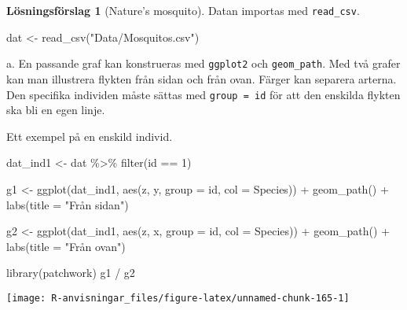\documentclass[
]{book}
\newenvironment{Shaded}{\begin{snugshade}}{\end{snugshade}}
\newcommand{\AttributeTok}[1]{\textcolor[rgb]{0.77,0.63,0.00}{#1}}
\newcommand{\DecValTok}[1]{\textcolor[rgb]{0.00,0.00,0.81}{#1}}
\newcommand{\FunctionTok}[1]{\textcolor[rgb]{0.00,0.00,0.00}{#1}}
\newcommand{\NormalTok}[1]{#1}
\newcommand{\OtherTok}[1]{\textcolor[rgb]{0.56,0.35,0.01}{#1}}
\newcommand{\SpecialCharTok}[1]{\textcolor[rgb]{0.00,0.00,0.00}{#1}}
\newcommand{\StringTok}[1]{\textcolor[rgb]{0.31,0.60,0.02}{#1}}
\theoremstyle{definition}
\theoremstyle{definition}
\theoremstyle{definition}
\theoremstyle{definition}
\newtheorem{hypothesis}{Lösningsförslag}[chapter]
\theoremstyle{remark}
\begin{document}
\begin{hypothesis}[Nature's mosquito]
Datan importas med \texttt{read\_csv}.

\begin{Shaded}
\begin{Highlighting}[]
\NormalTok{dat }\OtherTok{\textless{}{-}} \FunctionTok{read\_csv}\NormalTok{(}\StringTok{"Data/Mosquitos.csv"}\NormalTok{)}
\end{Highlighting}
\end{Shaded}

a. En passande graf kan konstrueras med \texttt{ggplot2} och \texttt{geom\_path}. Med två grafer kan man illustrera flykten från sidan och från ovan. Färger kan separera arterna. Den specifika individen måste sättas med \texttt{group\ =\ id} för att den enskilda flykten ska bli en egen linje.

Ett exempel på en enskild individ.

\begin{Shaded}
\begin{Highlighting}[]
\NormalTok{dat\_ind1 }\OtherTok{\textless{}{-}}\NormalTok{ dat }\SpecialCharTok{\%\textgreater{}\%} \FunctionTok{filter}\NormalTok{(id }\SpecialCharTok{==} \DecValTok{1}\NormalTok{)}

\NormalTok{g1 }\OtherTok{\textless{}{-}} \FunctionTok{ggplot}\NormalTok{(dat\_ind1, }\FunctionTok{aes}\NormalTok{(z, y, }\AttributeTok{group =}\NormalTok{ id, }\AttributeTok{col =}\NormalTok{ Species)) }\SpecialCharTok{+} 
  \FunctionTok{geom\_path}\NormalTok{() }\SpecialCharTok{+}
  \FunctionTok{labs}\NormalTok{(}\AttributeTok{title =} \StringTok{"Från sidan"}\NormalTok{)}

\NormalTok{g2 }\OtherTok{\textless{}{-}} \FunctionTok{ggplot}\NormalTok{(dat\_ind1, }\FunctionTok{aes}\NormalTok{(z, x, }\AttributeTok{group =}\NormalTok{ id, }\AttributeTok{col =}\NormalTok{ Species)) }\SpecialCharTok{+} 
  \FunctionTok{geom\_path}\NormalTok{() }\SpecialCharTok{+}
  \FunctionTok{labs}\NormalTok{(}\AttributeTok{title =} \StringTok{"Från ovan"}\NormalTok{)}

\FunctionTok{library}\NormalTok{(patchwork)}
\NormalTok{g1 }\SpecialCharTok{/}\NormalTok{ g2}
\end{Highlighting}
\end{Shaded}

\begin{center}\texttt{[image: R-anvisningar\_files/figure-latex/unnamed-chunk-165-1]} \end{center}


\end{hypothesis}
\end{document}
